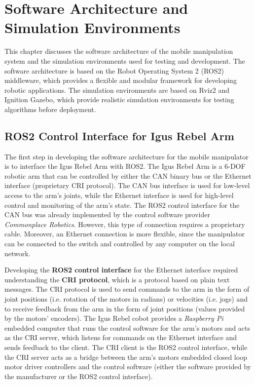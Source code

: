 
\chapter{Software Architecture and Simulation Environments}

This chapter discusses the software architecture of the mobile manipulation system and the simulation 
environments used for testing and development. The software architecture is based on the Robot Operating System 2 (ROS2)
middleware, which provides a flexible and modular framework for developing robotic applications. 
The simulation environments are based on Rviz2 and Ignition Gazebo, which provide realistic simulation environments
for testing algorithms before deployment.

\section{ROS2 Control Interface for Igus Rebel Arm}

The first step in developing the software architecture for the mobile manipulator is to interface the
Igus Rebel Arm with ROS2. The Igus Rebel Arm is a 6-DOF robotic arm that can be controlled by either the CAN binary bus
or the Ethernet interface (proprietary CRI protocol). The CAN bus interface is used for low-level access to the arm's
joints, while the Ethernet interface is used for high-level control and monitoring of the arm's state. 
The ROS2 control interface for the CAN bus was already implemented by the control software provider \textit{Commonplace Robotics}.
However, this type of connection requires a proprietary cable. Moreover, an Ethernet connection is more flexible, since the manipulator can be connected to the switch and controlled by any computer on the local network.

Developing the \textbf{ROS2 control interface} for the Ethernet interface required understanding the \textbf{CRI protocol},
which is a protocol based on plain text messages. The CRI protocol is used to send commands to the arm in the form of
joint positions (i.e. rotation of the motors in radians) or velocities (i.e. jogs) 
and to receive feedback from the arm in the form of joint positions (values provided by the motors' encoders).
The Igus Rebel cobot provides a \textit{Raspberry Pi} embedded computer that runs the control software for the arm's motors
and acts as the CRI server, which listens for commands on the Ethernet interface and sends feedback to the client.
The CRI client is the ROS2 control interface, while the CRI server acts as a bridge between the arm's motors embedded
closed loop motor driver controllers and the control software (either the software provided by the manufacturer or
the ROS2 control interface).

